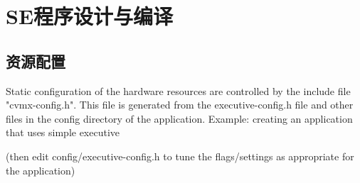 \section{SE程序设计与编译}
\subsection{资源配置}
Static configuration of the hardware resources are controlled by the include file "cvmx-config.h". This file is generated from the executive-config.h file and other files in the config directory of the application. 
Example: creating an application that uses simple executive
\begin{shellcmd}
\end{shellcmd}
(then edit config/executive-config.h to tune the flags/settings as appropriate for the application)
